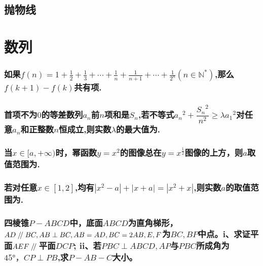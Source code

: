 \documentclass[oneside]{book}
\newcommand{\1}{\underline{\makebox[1cm]{}}}
\newcommand{\2}{\underline{\makebox[2cm]{}}}
\newcommand{\3}{\underline{\makebox[3cm]{}}}
\newcommand{\4}{\underline{\makebox[4cm]{}}}
\newcommand{\blk}{\vspace*{1\baselineskip} }
\newcommand{\blkc}{\vspace*{6\baselineskip} }
\newcommand{\blkb}{\vspace*{32\baselineskip} }
\newcommand{\pll}{\kern 0.56em/\kern -0.8em /\kern 0.56em}
\newlength{\la}
\begin{document}
    \chapter{抛物线}



\part{数列}

    \section{如果$f(n)=1+\frac{1}{2}+\frac{1}{3}+\cdots+\frac{1}{n}+\frac{1}{n+1}+\cdots+\frac{1}{2^n}(n\in \mathbb{N^*})$,那么$f(k+1)-f(k)$共有\2项.}
    \blk

    \section{首项不为$0$的等差数列${a_n}$前$n$项和是$S_n$,若不等式${a_n}^2+\dfrac{{S_n}^2}{n^2}\geq \lambda {a_1}^2$对任意$a_n$和正整数$n$恒成立,则实数$\lambda$的最大值为\2.}
    \blkc

    \section{当$x \in [a, + \infty)$时，幂函数$y=x^2$的图像总在$y=x^{\frac{1}{2}}$图像的上方，则$a$取值范围为\2.}
    \blkb

    \section{若对任意$x \in[1,2]$,均有$|x^2-a|+|x+a|=|x^2+x|$,则实数$a$的取值范围为\2.}
    \blkb

    \section{四棱锥$P-ABCD$中，底面$ABCD$为直角梯形，$AD \pll BC,AB \perp BC,AB = AD,BC = 2AB,E,F$为$BC,BP$中点。i、求证平面$AEF \pll $平面$DCP$; ii、若$PBC \perp ABCD,AP$与$PBC$所成角为$45 °，CP \perp PB$,求$P-AB-C$大小。}
    \blkb
\end{document}
